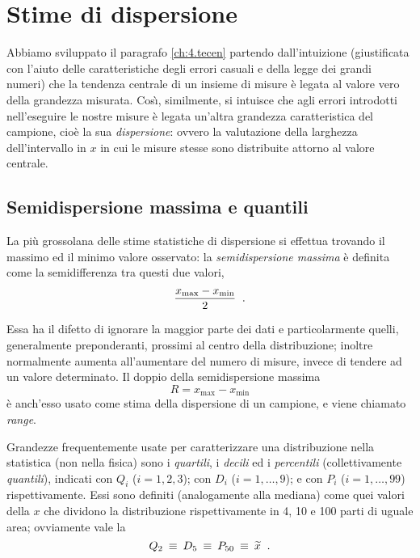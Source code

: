\section{Stime di dispersione}%
Abbiamo sviluppato il paragrafo \ref{ch:4.tecen} partendo
dall'intuizione (giustificata con l'aiuto delle
caratteristiche degli errori casuali e della legge dei
grandi numeri) che la tendenza centrale di un insieme di
misure \`e legata al valore vero della grandezza misurata.
Cos\`\i, similmente, si intuisce che agli errori introdotti
nell'eseguire le nostre misure \`e legata un'altra grandezza
caratteristica del campione, cio\`e la sua
\emph{dispersione}: ovvero la valutazione della larghezza
dell'intervallo in $x$ in cui le misure stesse sono
distribuite attorno al valore centrale.

\subsection{Semidispersione massima e quantili}%
%
La pi\`u grossolana delle stime statistiche di dispersione
si effettua trovando il massimo ed il minimo valore
osservato: la \emph{semidispersione massima} \`e definita
come la semidifferenza tra questi due valori,
\begin{equation*}
  \frac{x_{\max} - x_{\min}}{2} \;\; .
\end{equation*}

Essa ha il difetto di ignorare la maggior parte dei dati e
particolarmente quelli, generalmente preponderanti, prossimi
al centro della distribuzione; inoltre normalmente aumenta
all'aumentare del numero di misure, invece di tendere ad un
valore determinato.  Il doppio della semidispersione massima
\begin{equation*}
  R = x_{\max} - x_{\min}
\end{equation*}
\`e anch'esso usato come stima della dispersione di un
campione, e viene chiamato \emph{range}.%
%

%
%
%
%
Grandezze frequentemente usate per caratterizzare una
distribuzione nella statistica (non nella fisica) sono i
\emph{quartili}, i \emph{decili} ed i \emph{percentili}
(collettivamente \emph{quantili}), indicati con $Q_i$ ($i=1,
2, 3$); con $D_i$ ($i=1, \ldots, 9$); e con $P_i$
($i=1,\ldots, 99$) rispettivamente.  Essi sono definiti
(analogamente alla mediana) come quei valori della $x$ che
dividono la distribuzione rispettivamente in 4, 10 e 100
parti di uguale area; ovviamente vale la
\begin{equation*}
  Q_2 \: \equiv \: D_5 \: \equiv \: P_{50}
  \: \equiv \: \widetilde x \;\; .
\end{equation*}

